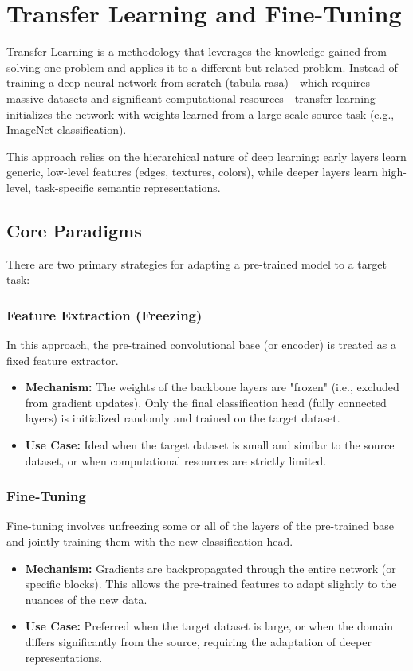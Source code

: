 \documentclass[12pt,a4paper]{report}
\begin{document}
\section{Transfer Learning and Fine-Tuning}

Transfer Learning is a methodology that leverages the knowledge gained from solving one problem and applies it to a different but related problem. Instead of training a deep neural network from scratch (tabula rasa)---which requires massive datasets and significant computational resources---transfer learning initializes the network with weights learned from a large-scale source task (e.g., ImageNet classification).

This approach relies on the hierarchical nature of deep learning: early layers learn generic, low-level features (edges, textures, colors), while deeper layers learn high-level, task-specific semantic representations.



\subsection{Core Paradigms}
There are two primary strategies for adapting a pre-trained model to a target task:

\subsubsection{Feature Extraction (Freezing)}
In this approach, the pre-trained convolutional base (or encoder) is treated as a fixed feature extractor.
\begin{itemize}
    \item \textbf{Mechanism:} The weights of the backbone layers are "frozen" (i.e., excluded from gradient updates). Only the final classification head (fully connected layers) is initialized randomly and trained on the target dataset.
    \item \textbf{Use Case:} Ideal when the target dataset is small and similar to the source dataset, or when computational resources are strictly limited.
\end{itemize}

\subsubsection{Fine-Tuning}
Fine-tuning involves unfreezing some or all of the layers of the pre-trained base and jointly training them with the new classification head.
\begin{itemize}
    \item \textbf{Mechanism:} Gradients are backpropagated through the entire network (or specific blocks). This allows the pre-trained features to adapt slightly to the nuances of the new data.
    \item \textbf{Use Case:} Preferred when the target dataset is large, or when the domain differs significantly from the source, requiring the adaptation of deeper representations.
\end{itemize}
\end{document}
